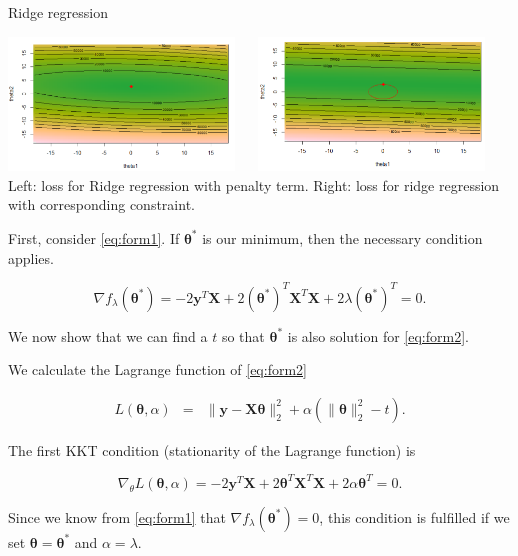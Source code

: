 \documentclass[11pt,compress,t,notes=noshow, xcolor=table]{beamer}
\begin{document}
\begin{vbframe}{Ridge regression}
\lz

\begin{center}
\includegraphics[width = 0.45\textwidth]{figure_man/ridge_formulation1.png} ~~ \includegraphics[width = 0.45\textwidth]{figure_man/ridge_formulation2.png} \\
Left: loss for Ridge regression with penalty term. Right: loss for ridge regression with corresponding constraint.
\end{center}


\framebreak

First, consider \eqref{eq:form1}. If $\bm{\theta}^*$ is our minimum, then the necessary condition applies.

$$
\nabla f_\lambda(\bm{\theta}^*) = - 2 \bm{y}^T\mathbf{X} + 2 (\bm{\theta}^*)^T \mathbf{X}^T\mathbf{X} + 2 \lambda (\bm{\theta}^*)^T = 0.
$$

We now show that we can find a $t$ so that $\bm{\theta}^*$ is also solution for \eqref{eq:form2}.

\lz

We calculate the Lagrange function of \eqref{eq:form2}

\vspace*{-0.5cm}
\begin{eqnarray*}
  L(\bm{\theta}, \alpha) &=& \|\bm{y} - \mathbf{X}\bm{\theta}\|_2^2 + \alpha (\|\bm{\theta}\|^2_2 - t).
\end{eqnarray*}

The first KKT condition (stationarity of the Lagrange function) is

$$
\nabla_\theta L(\bm{\theta}, \alpha)= - 2\bm{y}^T\mathbf{X} + 2 \bm{\theta}^T \mathbf{X}^T\mathbf{X} + 2 \alpha \bm{\theta}^T = 0.
$$

Since we know from \eqref{eq:form1} that $\nabla f_\lambda(\bm{\theta}^*) = 0$, this condition is fulfilled if we set $\bm{\theta} = \bm{\theta}^*$ and $\alpha = \lambda$.


\end{vbframe}
\end{document}
